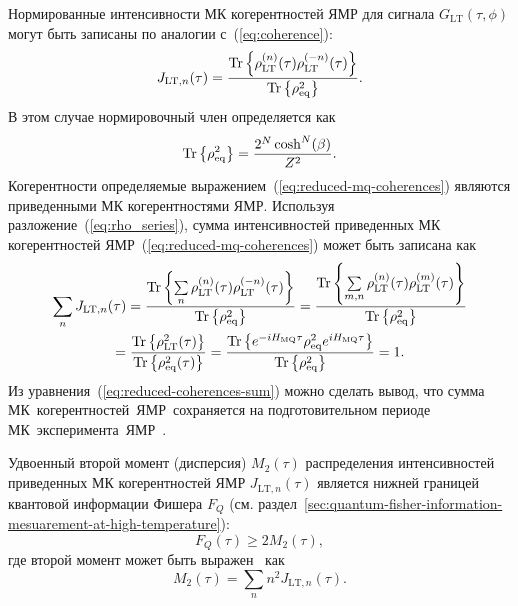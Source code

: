 Нормированные интенсивности МК когерентностей ЯМР для сигнала $G_\mathrm{LT}(\tau, \phi)$
могут быть записаны по аналогии с~(\ref{eq:coherence}):
%
\begin{equation}\label{eq:reduced-mq-coherences}
    J_{\mathrm{LT}, n}(\tau) =
    \frac{\mathrm{Tr} \left\{ 
        \rho_\mathrm{LT}^{(n)}(\tau)
        \rho_\mathrm{LT}^{(-n)}(\tau)
     \right\}}
    {\mathrm{Tr} \left\{ \rho^2_\mathrm{eq} \right\}}.
\end{equation}
%
В этом случае нормировочный член определяется как
%
\begin{equation}\label{eq:j_lt_norm}
  \mathrm{Tr} \left\{ \rho^2_\mathrm{eq} \right\} =
    \frac{2^N \cosh^N(\beta)}{Z^2}.
\end{equation}
Когерентности определяемые выражением~(\ref{eq:reduced-mq-coherences})
являются приведенными МК когерентностями ЯМР.
%
Используя разложение~(\ref{eq:rho_series}),
сумма интенсивностей приведенных МК когерентностей ЯМР~(\ref{eq:reduced-mq-coherences}) может быть записана как
%
\begin{multline}\label{eq:reduced-coherences-sum}
  \sum\limits_{n} J_{\mathrm{LT}, n}(\tau)
  = \dfrac{
    \mathrm{Tr} \left\{ 
      \sum\limits_{n}
      \rho_\mathrm{LT}^{(n)}(\tau)
      \rho_\mathrm{LT}^{(-n)}(\tau) \right\}
    }{
    \mathrm{Tr} \left\{ \rho^2_\mathrm{eq}  \right\}
  }
  = \dfrac{
    \mathrm{Tr} \left\{ 
      \sum\limits_{m,n}
      \rho_\mathrm{LT}^{(n)}(\tau)
      \rho_\mathrm{LT}^{(m)}(\tau)
     \right\}}{
    \mathrm{Tr} \left\{ \rho^2_\mathrm{eq} \right\}
  }
  \\
  = \dfrac{
    \mathrm{Tr} \left\{ \rho_\mathrm{LT}^2(\tau) \right\}
  }{
    \mathrm{Tr} \left\{ \rho^2_\mathrm{eq}(\tau) \right\}
  }
  = \dfrac{
    \mathrm{Tr} \left\{ 
      e^{-i H_\mathrm{MQ} \tau}
      \rho^{2}_\mathrm{eq}
      e^{i H_\mathrm{MQ} \tau}
     \right\}
  }{
    \mathrm{Tr} \left\{  \rho^2_\mathrm{eq} \right\}
  }
  = 1.
\end{multline}
%
Из уравнения~(\ref{eq:reduced-coherences-sum}) можно сделать вывод, что сумма МК~когерентностей~ЯМР~сохраняется на подготовительном периоде МК~эксперимента~ЯМР~\cite{Baum1985}.


Удвоенный второй момент (дисперсия) $M_2(\tau)$ распределения интенсивностей приведенных МК когерентностей ЯМР $J_{\mathrm{LT}, n} (\tau)$
является нижней границей квантовой информации Фишера $F_{Q}$
(см. раздел~\ref{sec:quantum-fisher-information-mesuarement-at-high-temperature}):
\begin{equation}\label{eq:fisher-low-bound}
  F_{Q}(\tau) \geq 2M_2(\tau),
\end{equation}
где второй момент может быть выражен~\cite{Khitrin1997} как
%
\begin{equation}\label{eq:m2-via-coherences}
  M_2(\tau) = \sum\limits_n n^2 J_{\mathrm{LT}, n} (\tau).
\end{equation}

